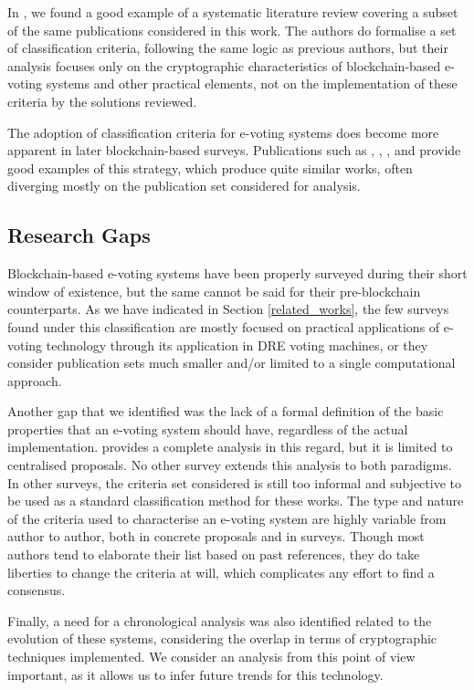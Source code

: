 \documentclass{ieeeaccess}
\begin{document}
    \par
    In \cite{Tas2020}, we found a good example of a systematic literature review covering a subset of the same publications considered in this work. The authors do formalise a set of classification criteria, following the same logic as previous authors, but their analysis focuses only on the cryptographic characteristics of blockchain-based e-voting systems and other practical elements, not on the implementation of these criteria by the solutions reviewed.
    \par
    The adoption of classification criteria for e-voting systems does become more apparent in later blockchain-based surveys. Publications such as \cite{Rabia2021}, \cite{Vivek2020}, \cite{Cabuk2020}, and \cite{Jafar2021} provide good examples of this strategy, which produce quite similar works, often diverging mostly on the publication set considered for analysis.
    
    \subsection{Research Gaps}
    \label{research-gaps}
    Blockchain-based e-voting systems have been properly surveyed during their short window of existence, but the same cannot be said for their pre-blockchain counterparts. As we have indicated in Section \ref{related_works}, the few surveys found under this classification are mostly focused on practical applications of e-voting technology through its application in DRE voting machines, or they consider publication sets much smaller and/or limited to a single computational approach.
    \par
    Another gap that we identified was the lack of a formal definition of the basic properties that an e-voting system should have, regardless of the actual implementation. \cite{Ali2016} provides a complete analysis in this regard, but it is limited to centralised proposals. No other survey extends this analysis to both paradigms. In other surveys, the criteria set considered is still too informal and subjective to be used as a standard classification method for these works. The type and nature of the criteria used to characterise an e-voting system are highly variable from author to author, both in concrete proposals and in surveys. Though most authors tend to elaborate their list based on past references, they do take liberties to change the criteria at will, which complicates any effort to find a consensus.
    \par
    Finally, a need for a chronological analysis was also identified related to the evolution of these systems, considering the overlap in terms of cryptographic techniques implemented. We consider an analysis from this point of view important, as it allows us to infer future trends for this technology.
    
\end{document}
